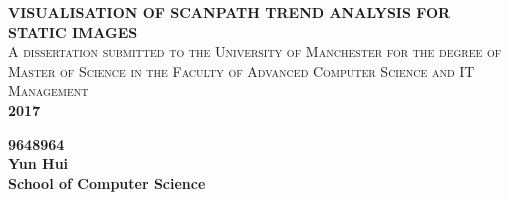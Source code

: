 \documentclass{ctexart}
\begin{document}
	\begin{titlepage}
		\begin{center}
			\LARGE \textbf{VISUALISATION OF SCANPATH\vspace{7.5pt} TREND ANALYSIS FOR STATIC\vspace{7.5pt} IMAGES}\\ [1.5cm] 
			
			\scshape{\large A dissertation submitted to the University of Manchester for the degree of Master of Science in the Faculty of Advanced Computer Science and IT Management}\\ [0.7cm]
			
			
			\textbf{2017} \\
			\vfil %
			
			\textbf{9648964}\\
			
			\textbf{Yun Hui}\\
			
			\textbf{School of Computer Science}
			
		\end{center}
	\end{titlepage}
\end{document}
